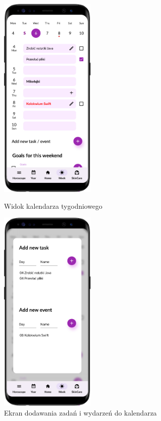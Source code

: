 \begin{figure}[t]
	\begin{minipage}{0.4\textwidth}
		\centering
		\includegraphics[height=10cm, keepaspectratio]{images/interfejs_figma/Week}
		\caption{Widok kalendarza tygodniowego}
		\label{fig:Week}
	\end{minipage}
	\hfill
	\begin{minipage}{0.4\textwidth}
		\centering
		\includegraphics[height=10cm,           keepaspectratio]{images/interfejs_figma/Task_Event}
		\caption{Ekran dodawania zadań i wydarzeń do kalendarza}
		\label{fig:Task_Event}
	\end{minipage}
\end{figure}

